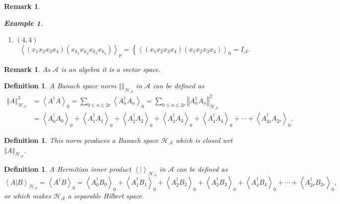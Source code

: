 \documentclass[aps,preprint]{revtex4}%
\newtheorem{definition}[theorem]{Definition}
\newtheorem{example}[theorem]{Example}
\newtheorem{remark}[theorem]{Remark}
\begin{document}
\begin{remark}
\begin{example}
\begin{enumerate}
\begin{enumerate}
\item $\left(  4,4\right)  $%
\[
\left\langle \left(  x_{1}x_{2}x_{3}x_{4}\right)  \left(  x_{k_{1}}x_{k_{2}%
}x_{k_{3}}x_{k_{4}}\right)  \right\rangle _{p}=\left\{  \left\langle \left(
x_{1}x_{2}x_{3}x_{4}\right)  \left(  x_{1}x_{2}x_{3}x_{4}\right)
\right\rangle _{0}\right.  =I_{\mathcal{A}}.
\]

\end{enumerate}
\end{enumerate}
\end{example}
\end{remark}

\begin{remark}
As $\mathcal{A}$ is an algebra it is a vector space.
\end{remark}

\begin{definition}
A \emph{Banach space norm} $\left\Vert {}\right\Vert _{\mathcal{H}%
_{\mathcal{A}}}$ in $\mathcal{A}$ can be defined as
\begin{align}
\left\Vert A\right\Vert _{\mathcal{H}_{\mathcal{A}}}^{2}  &  =\left\langle
A^{\dagger}A\right\rangle _{0}=\sum_{0\leq n\leq2r}\left\langle A_{n}%
^{\dagger}A_{n}\right\rangle _{0}=\sum_{0\leq n\leq2r}\left\Vert
A_{n}^{\dagger}A_{n}\right\Vert _{\mathcal{H}_{\mathcal{A}}}^{2}\\
&  =\left\langle A_{0}^{\dagger}A_{0}\right\rangle _{0}+\left\langle
A_{1}^{\dagger}A_{1}\right\rangle _{0}+\left\langle A_{2}^{\dagger}%
A_{2}\right\rangle _{0}+\left\langle A_{3}^{\dagger}A_{3}\right\rangle
_{0}+\left\langle A_{4}^{\dagger}A_{4}\right\rangle _{0}+\cdots+\left\langle
A_{2r}^{\dagger}A_{2r}\right\rangle _{0}.
\end{align}

\end{definition}

\begin{definition}
This norm produces a \emph{Banach space }$\mathcal{H}_{\mathcal{A}}$ which is
closed wrt $\left\Vert A\right\Vert _{\mathcal{H}_{\mathcal{A}}}.$
\end{definition}

\begin{definition}
A \emph{Hermitian} inner product $\left\langle \left.  {}\right\vert
\right\rangle _{\mathcal{H}_{\mathcal{A}}}$ in $\mathcal{A}$ can be defined
as
\begin{equation}
\left\langle \left.  A\right\vert B\right\rangle _{\mathcal{H}_{\mathcal{A}}%
}=\left\langle A^{\dagger}B\right\rangle _{0}=\left\langle A_{0}^{\dagger
}B_{0}\right\rangle _{0}+\left\langle A_{1}^{\dagger}B_{1}\right\rangle
_{0}+\left\langle A_{2}^{\dagger}B_{2}\right\rangle _{0}+\left\langle
A_{3}^{\dagger}B_{3}\right\rangle _{0}+\left\langle A_{4}^{\dagger}%
B_{4}\right\rangle _{0}+\cdots+\left\langle A_{2r}^{\dagger}B_{2r}%
\right\rangle _{0},
\end{equation}
or which makes $\mathcal{H}_{\mathcal{A}}$ a \emph{separable} Hilbert space.
\end{definition}
\end{document}

